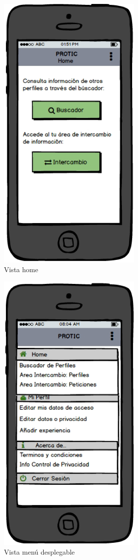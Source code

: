 \documentclass[a4paper, 12pt]{book}
\begin{document}
    \begin{figure}
        \centering
        \includegraphics[width=7cm, keepaspectratio]{img/old_vista_home.PNG}
        \caption{Vista home}
    \end{figure}

    \begin{figure}
        \centering
        \includegraphics[width=7cm, keepaspectratio]{img/old_vista_men_desplegable.PNG}
        \caption{Vista menú desplegable}
    \end{figure}
\end{document}
